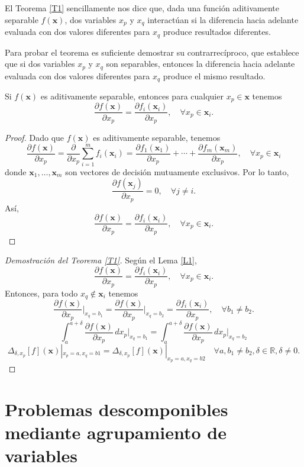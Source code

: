 El Teorema \ref{T1} sencillamente nos dice que, dada una función aditivamente separable \( f(\mathbf{x}) \), dos variables \( x_p \) y \( x_q \) interactúan si la diferencia hacia adelante evaluada con dos valores diferentes para \( x_q \) produce resultados diferentes.

Para probar el teorema es suficiente demostrar su contrarrecíproco, que establece que si dos variables \( x_p \) y \( x_q \) son separables, entonces la diferencia hacia adelante evaluada con dos valores diferentes para \( x_q \) produce el mismo resultado.


\begin{lema}
\label{L1}
Si \( f(\mathbf{x}) \) es aditivamente separable, entonces para cualquier \( x_p \in \mathbf{x} \) tenemos
\[
\frac{\partial f(\mathbf{x})}{\partial x_p} = \frac{\partial f_i(\mathbf{x}_i)}{\partial x_p}, \quad \forall x_p \in \mathbf{x}_i.
\]
\end{lema}

\begin{proof}
Dado que \( f(\mathbf{x}) \) es aditivamente separable, tenemos
\[
\frac{\partial f(\mathbf{x})}{\partial x_p} = \frac{\partial}{\partial x_p} \sum_{i=1}^{m} f_i(\mathbf{x}_i) = \frac{\partial f_1(\mathbf{x}_1)}{\partial x_p} + \cdots + \frac{\partial f_m(\mathbf{x}_m)}{\partial x_p}, \quad \forall x_p \in \mathbf{x}_i
\]
donde \( \mathbf{x}_1, \ldots, \mathbf{x}_m \) son vectores de decisión mutuamente exclusivos. Por lo tanto,
\[
\frac{\partial f(\mathbf{x}_j)}{\partial x_p} = 0, \quad \forall j \neq i.
\]
Así,
\[
\frac{\partial f(\mathbf{x})}{\partial x_p} = \frac{\partial f_i(\mathbf{x}_i)}{\partial x_p}, \quad \forall x_p \in \mathbf{x}_i.
\]
\end{proof}

\begin{proof}[Demostración del Teorema \ref{T1}]
Según el Lema \ref{L1},
\[
\frac{\partial f(\mathbf{x})}{\partial x_p} = \frac{\partial f_i(\mathbf{x}_i)}{\partial x_p}, \quad \forall x_p \in \mathbf{x}_i.
\]
Entonces, para todo \( x_q \notin \mathbf{x}_i \) tenemos
\[
\frac{\partial f(\mathbf{x})}{\partial x_p} \bigg|_{x_q=b_1} = \frac{\partial f(\mathbf{x})}{\partial x_p} \bigg|_{x_q=b_2} = \frac{\partial f_i(\mathbf{x}_i)}{\partial x_p}, \quad \forall b_1 \neq b_2.
\]
\[
\int_{a}^{a+\delta} \frac{\partial f(\mathbf{x})}{\partial x_p} \, dx_p \bigg|_{x_q=b_1} = \int_{a}^{a+\delta} \frac{\partial f(\mathbf{x})}{\partial x_p} \, dx_p \bigg|_{x_q=b_2}
\]
\[
\Delta_{\delta,x_p}[f](\mathbf{x})|_{x_p=a, x_q=b1} = \Delta_{\delta,x_p}[f](\mathbf{x})|_{x_p=a, x_q=b2} \quad \forall a, b_1 \neq b_2, \delta \in \mathbb{R}, \delta \neq 0.
\]
\end{proof}

\section{Problemas descomponibles mediante agrupamiento de variables}


\endinput
